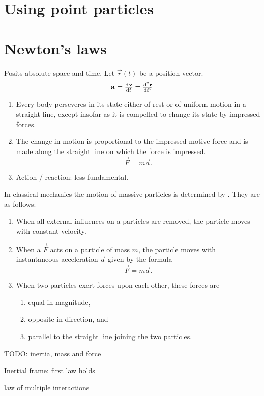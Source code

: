 \section{Using point particles}

\section{Newton's laws}
Posits absolute space and time.
Let $\vec{r}(t)$ be a position vector.
\[ \vec{a} = \od{\vec{v}}{t} = \od[2]{\vec{r}}{t} \]
\begin{enumerate}
\item Every body perseveres in its state either of rest or of uniform motion in a straight line, except insofar as it is compelled to change its state by impressed forces.
\item The change in motion is proportional to the impressed motive force and is made along the straight line on which the force is impressed.
\[ \vec{F} = m \vec{a}. \]
\item Action / reaction: less fundamental.
\end{enumerate}

In classical mechanics the motion of massive particles is determined by . They are as follows:
\begin{eigenschap}
\begin{enumerate}
\item When all external influences on a particles are removed, the particle moves with constant velocity.
\item When a  $\vec{F}$ acts on a particle of mass $m$, the particle moves with instantaneous acceleration $\vec{a}$ given by the formula
\[\vec{F}=m \vec{a}.\]
\item When two particles exert forces upon each other, these forces are
\begin{enumerate}
\item equal in magnitude,
\item opposite in direction, and
\item parallel to the straight line joining the two particles.
\end{enumerate}
\end{enumerate}
\end{eigenschap}

TODO: inertia, mass and force

Inertial frame: first law holds

law of multiple interactions

